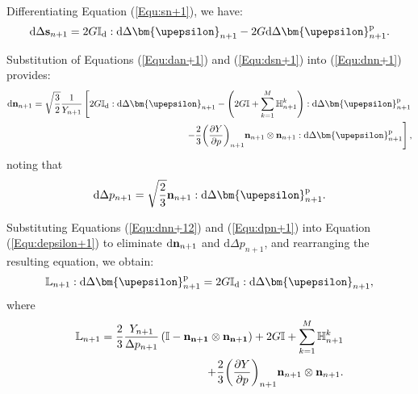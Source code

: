 Differentiating Equation (\ref{Equ:sn+1}), we have:
\begin{equation}
\label{Equ:dsn+1}
{\text{d}}\Delta {{\bf{s}}_{n + 1}} = 2G{\mathbb{I}_{\rm{d}}}:{\text{d}}\Delta {{\bm{\upepsilon }}_{n + 1}} - 2G{\text{d}}\Delta {\bm{\upepsilon }}_{n + 1}^{\rm{p}}.
\end{equation}

Substitution of Equations (\ref{Equ:dan+1}) and (\ref{Equ:dsn+1}) into (\ref{Equ:dnn+1}) provides:
\begin{equation}
\label{Equ:dnn+12}
\begin{aligned}
{\text{d}}{{\bf{n}}_{n + 1}} = \sqrt {\frac{3}{2}} \frac{1}{{{Y_{n + 1}}}} \left[ {2G{\mathbb{I}_{\rm{d}}}:{\text{d}}\Delta {{\bm{\upepsilon }}_{n + 1}} - \left( {2G\mathbb{I} + \sum\limits_{k = 1}^M {\mathbb{H}_{n + 1}^k} } \right):{\text{d}}\Delta {\bm{\upepsilon }}_{n + 1}^{\rm{p}}} \right.\\
\left. { - \frac{2}{3}{{\left( {\frac{{\partial Y}}{{\partial p}}} \right)}_{n + 1}}{{\bf{n}}_{n + 1}} \otimes {{\bf{n}}_{n + 1}}:{\text{d}}\Delta {\bm{\upepsilon }}_{n + 1}^{\rm{p}}}\right],
\end{aligned}
\end{equation}
noting that
\begin{equation}
\label{Equ:dpn+1}
{\text{d}}\Delta {p_{n + 1}} = \sqrt {\frac{2}{3}} {{\bf{n}}_{n + 1}}:{\text{d}}\Delta {\bm{\upepsilon }}_{n + 1}^{\rm{p}}.
\end{equation}

Substituting Equations (\ref{Equ:dnn+12}) and (\ref{Equ:dpn+1}) into Equation (\ref{Equ:depsilon+1}) to eliminate ${\text{d}}{{\bf{n}}_{n + 1}}$ and ${\text{d}}\Delta {p_{n + 1}}$, and rearranging the resulting equation, we obtain:
\begin{equation}
{\mathbb{L}_{n + 1}}:{\text{d}}\Delta {\bm{\upepsilon }}_{n + 1}^{\rm{p}} = 2G{\mathbb{I}_{\rm{d}}}:{\text{d}}\Delta {{\bm{\upepsilon }}_{n + 1}},
\end{equation}
where
\begin{equation}
\label{Equ:Ln+1}
\begin{aligned}
\mathbb{L}_{n + 1} = \frac{2}{3}\frac{Y_{n + 1}}{\Delta {p_{n + 1}}} \left( \mathbb{I} - \bf{n}_{n + 1} \otimes \bf{n}_{n + 1} \right) + 2G\mathbb{I} + \sum \limits_{k = 1}^M {\mathbb{H}_{n + 1}^k} \\
   + \frac{2}{3}{{\left( {\frac{{\partial Y}}{{\partial p}}} \right)}_{n + 1}}{{\bf{n}}_{n + 1}} \otimes {{\bf{n}}_{n + 1}}.
\end{aligned}
\end{equation}

